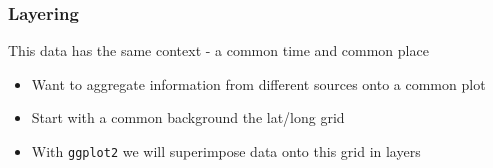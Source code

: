 \documentclass{beamer}\usepackage[]{graphicx}\usepackage[]{color}
\begin{document}

\begin{frame}[fragile]
\frametitle{Layering}
This data has the same context - a common time and common place

   \begin{itemize}
    \item Want to aggregate information from different sources onto a common plot\medskip
    \item Start with a common background the lat/long grid\medskip
    \item With \texttt{ggplot2} we will superimpose data onto this grid in layers\medskip
\end{itemize} 
\small

    \normalsize
\end{frame}


\end{document}
